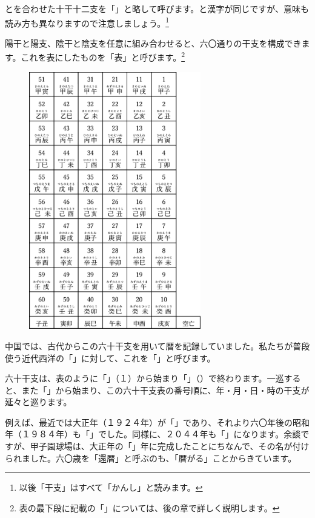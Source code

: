 \documentclass[a5paper,11pt,dvipdfmx]{tarticle}
\begin{document}
\subsubsection*{}

とを合わせた十干十二支を「」と略して呼びます。と漢字が同じですが、意味も読み方も異なりますので注意しましょう。\footnote{以後「干支」はすべて「かんし」と読みます。}

陽干と陽支、陰干と陰支を任意に組み合わせると、六〇通りの干支を構成できます。これを表にしたものを「表」と呼びます。\footnote{表の最下段に記載の「」については、後の章で詳しく説明します。}

\begin{figure}[h]
  \centering
  \includegraphics[width=75mm,angle=90]{figs/table2-3.eps}
\end{figure}

中国では、古代からこの六十干支を用いて暦を記録していました。私たちが普段使う近代西洋の「」に対して、これを「」と呼びます。

六十干支は、表のように「」（１）から始まり「」（）で終わります。一巡すると、また「」から始まり、この六十干支表の番号順に、年・月・日・時の干支が延々と巡ります。

例えば、最近では大正年（１９２４年）が「」であり、それより六〇年後の昭和年（１９８４年）も「」でした。同様に、２０４４年も「」になります。余談ですが、甲子園球場は、大正年の「」年に完成したことにちなんで、その名が付けられました。六〇歳を「還暦」と呼ぶのも、「暦がる」ことからきています。
\end{document}
